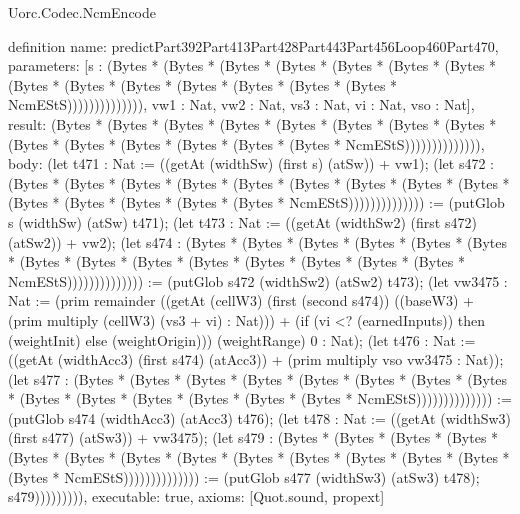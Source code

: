 \begin{lexlean}{Uorc.Codec.NcmEncode}
\begin{semanticmodule}
definition{
  name: predictPart392Part413Part428Part443Part456Loop460Part470,
  parameters: [s : (Bytes * (Bytes * (Bytes * (Bytes * (Bytes * (Bytes * (Bytes * (Bytes * (Bytes * (Bytes * (Bytes * (Bytes * (Bytes * (Bytes * NcmEStS)))))))))))))), vw1 : Nat, vw2 : Nat, vs3 : Nat, vi : Nat, vso : Nat],
  result: (Bytes * (Bytes * (Bytes * (Bytes * (Bytes * (Bytes * (Bytes * (Bytes * (Bytes * (Bytes * (Bytes * (Bytes * (Bytes * (Bytes * NcmEStS)))))))))))))),
  body: (let t471 : Nat := ((getAt (widthSw) (first s) (atSw)) + vw1); (let s472 : (Bytes * (Bytes * (Bytes * (Bytes * (Bytes * (Bytes * (Bytes * (Bytes * (Bytes * (Bytes * (Bytes * (Bytes * (Bytes * (Bytes * NcmEStS)))))))))))))) := (putGlob s (widthSw) (atSw) t471); (let t473 : Nat := ((getAt (widthSw2) (first s472) (atSw2)) + vw2); (let s474 : (Bytes * (Bytes * (Bytes * (Bytes * (Bytes * (Bytes * (Bytes * (Bytes * (Bytes * (Bytes * (Bytes * (Bytes * (Bytes * (Bytes * NcmEStS)))))))))))))) := (putGlob s472 (widthSw2) (atSw2) t473); (let vw3475 : Nat := (prim remainder ((getAt (cellW3) (first (second s474)) ((baseW3) + (prim multiply (cellW3) (vs3 + vi) : Nat))) + (if (vi <? (earnedInputs)) then (weightInit) else (weightOrigin))) (weightRange) 0 : Nat); (let t476 : Nat := ((getAt (widthAcc3) (first s474) (atAcc3)) + (prim multiply vso vw3475 : Nat)); (let s477 : (Bytes * (Bytes * (Bytes * (Bytes * (Bytes * (Bytes * (Bytes * (Bytes * (Bytes * (Bytes * (Bytes * (Bytes * (Bytes * (Bytes * NcmEStS)))))))))))))) := (putGlob s474 (widthAcc3) (atAcc3) t476); (let t478 : Nat := ((getAt (widthSw3) (first s477) (atSw3)) + vw3475); (let s479 : (Bytes * (Bytes * (Bytes * (Bytes * (Bytes * (Bytes * (Bytes * (Bytes * (Bytes * (Bytes * (Bytes * (Bytes * (Bytes * (Bytes * NcmEStS)))))))))))))) := (putGlob s477 (widthSw3) (atSw3) t478); s479))))))))),
  executable: true,
  axioms: [Quot.sound, propext]
}


\end{semanticmodule}
\end{lexlean}
